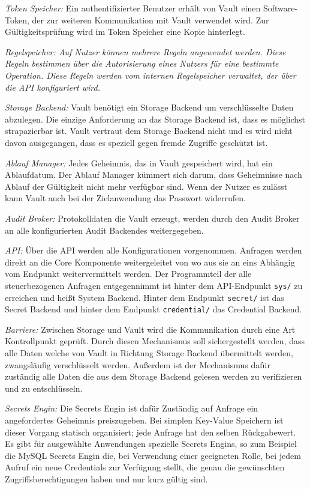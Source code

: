 \documentclass[
book,
a4paper,   
titlepage,  
halfparskip,
12pt        
]{scrartcl}
\newcommand\inline{\lstinline[basicstyle=\ttfamily]}
\begin{document}
\begin{onehalfspacing}
\textit{Token Speicher:} Ein authentifizierter Benutzer erhält von Vault einen Software-Token, der zur weiteren Kommunikation mit Vault verwendet wird. Zur Gültigkeitsprüfung wird im Token Speicher eine Kopie hinterlegt.

\textit{Regelspeicher: Auf Nutzer können mehrere Regeln angewendet werden. Diese Regeln bestimmen über die Autorisierung eines Nutzers für eine bestimmte Operation. Diese Regeln werden vom internen Regelspeicher verwaltet, der über die \ac{API} konfiguriert wird.}

\textit{Storage Backend:} Vault benötigt ein Storage Backend um verschlüsselte Daten abzulegen. Die einzige Anforderung an das Storage Backend ist, dass es möglichst strapazierbar ist. Vault vertraut dem Storage Backend nicht und es wird nicht davon ausgegangen, dass es speziell gegen fremde Zugriffe geschützt ist.

\textit{Ablauf Manager:} Jedes Geheimnis, das in Vault gespeichert wird, hat ein Ablaufdatum. Der Ablauf Manager kümmert sich darum, dass Geheimnisse nach Ablauf der Gültigkeit nicht mehr verfügbar sind. Wenn der Nutzer es zulässt kann Vault auch bei der Zielanwendung das Passwort widerrufen. 

\textit{Audit Broker:} Protokolldaten die Vault erzeugt, werden durch den Audit Broker an alle konfigurierten Audit Backendes weitergegeben.

\textit{\ac{API}:} Über die \ac{API} werden alle Konfigurationen vorgenommen. Anfragen werden direkt an die Core Komponente weitergeleitet von wo aus sie an eins Abhängig vom Endpunkt weitervermittelt werden.  Der Programmteil der alle steuerbezogenen Anfragen entgegennimmt ist hinter dem \ac{API}-Endpunkt \inline|sys/| zu erreichen und heißt System Backend. Hinter dem Endpunkt \inline|secret/| ist das Secret Backend und hinter dem Endpunkt \inline|credential/| das Credential Backend.

\textit{Barriere:} Zwischen Storage und Vault wird die Kommunikation durch eine Art Kontrollpunkt geprüft. Durch diesen Mechanismus soll sichergestellt werden, dass alle Daten welche von Vault in Richtung Storage Backend übermittelt werden, zwangsläufig verschlüsselt werden. Außerdem ist der Mechanismus dafür zuständig alle Daten die aus dem Storage Backend gelesen werden zu verifizieren und zu entschlüsseln.

\textit{Secrets Engin:} Die Secrets Engin ist dafür Zuständig auf Anfrage ein angefordertes Geheimnis preiszugeben. Bei simplen Key-Value Speichern ist dieser Vorgang statisch organisiert; jede Anfrage hat den selben Rückgabewert. Es gibt für ausgewählte Anwendungen spezielle Secrets Engins, so zum Beispiel die MySQL Secrets Engin die, bei Verwendung einer geeigneten Rolle, bei jedem Aufruf ein neue Credentials zur Verfügung stellt, die genau die gewünschten Zugriffsberechtigungen haben und nur kurz gültig sind.


\end{onehalfspacing}
\end{document}
